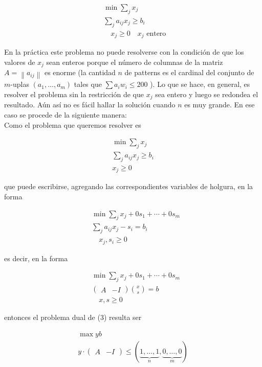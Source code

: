 \documentclass[10pt]{article}
\begin{document}
$$
\begin{aligned}
& \min \sum_{j} x_{j} \\
& \sum_{j} a_{i j} x_{j} \geq b_{i} \\
& \quad x_{j} \geq 0 \quad x_{j} \text { entero }
\end{aligned}
$$

En la práctica este problema no puede resolverse con la condición de que los valores de $x_{j}$ sean enteros porque el número de columnas de la matriz $A=\left\|a_{i j}\right\|$ es enorme (la cantidad $n$ de patterns es el cardinal del conjunto de $m$-uplas $\left(a_{1}, \ldots, a_{m}\right)$ tales que $\sum a_{i} w_{i} \leq 200$ ). Lo que se hace, en general, es resolver el problema sin la restricción de que $x_{j}$ sea entero y luego se redondea el resultado. Aún así no es fácil hallar la solución cuando $n$ es muy grande. En ese caso se procede de la siguiente manera:\\
Como el problema que queremos resolver es


\begin{gather*}
\min \sum_{j} x_{j} \\
\sum_{j} a_{i j} x_{j} \geq b_{i}  \tag{3}\\
x_{j} \geq 0
\end{gather*}


que puede escribirse, agregando las correspondientes variables de holgura, en la forma

$$
\begin{aligned}
& \min \sum_{j} x_{j}+0 s_{1}+\cdots+0 s_{m} \\
& \sum_{j} a_{i j} x_{j}-s_{i}=b_{i} \\
& \quad x_{j}, s_{i} \geq 0
\end{aligned}
$$

es decir, en la forma

$$
\begin{aligned}
& \min \sum_{j} x_{j}+0 s_{1}+\cdots+0 s_{m} \\
& \left(\begin{array}{ll}
A & -I
\end{array}\right)\binom{x}{s}=b \\
& \quad x, s \geq 0
\end{aligned}
$$

entonces el problema dual de (3) resulta ser

$$
\begin{gathered}
\max y b \\
y \cdot\left(\begin{array}{ll}
A & -I
\end{array}\right) \leq(\underbrace{1, \ldots, 1}_{n}, \underbrace{0, \ldots, 0}_{m})
\end{gathered}
$$
\end{document}
